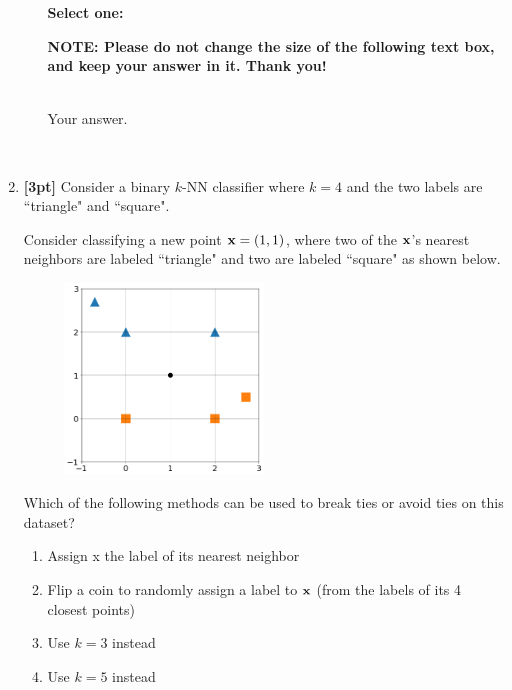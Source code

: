 \begin{enumerate}
\begin{enumerate}
    \textbf{Select one:}

    \textbf{NOTE: Please do not change the size of the following text box, and keep your answer in it. Thank you!} \\ \\
    \begin{tcolorbox}[fit,height=4cm, width=15cm, blank, borderline={1pt}{-2pt},nobeforeafter]
    \large
    Your answer.

    \end{tcolorbox} \\

    \end{enumerate}
    
    
    \item \textbf{[3pt]} Consider a binary $k$-NN classifier where $k=4$ and the two labels are ``triangle" and ``square".
    
    Consider classifying a new point $\mathbf{x} =(1,1)$, where two of the $\mathbf{x}$'s nearest neighbors are labeled ``triangle" and two are labeled ``square" as shown below.
    
    \begin{figure}[H]
        \centering
        \includegraphics[width = 0.5\textwidth]{1-1-5.png}
        \label{Q_5knn}
    \end{figure}
    
    Which of the following methods can be used to break ties or avoid ties on this dataset?
    
    \begin{enumerate}
        \item Assign x the label of its nearest neighbor
        \item Flip a coin to randomly assign a label to $\mathbf{x}$ (from the labels of its 4 closest points)
        \item Use $k = 3$ instead
        \item Use $k = 5$ instead
    \end{enumerate}


\end{enumerate}
